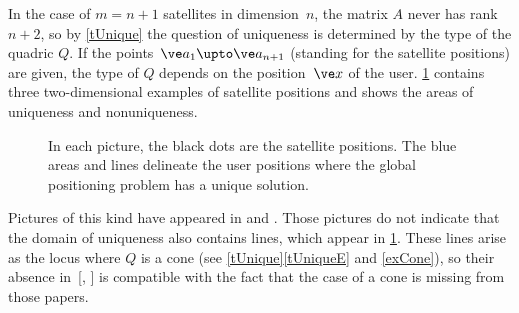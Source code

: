 \documentclass[reqno]{amsart}
\begin{document}
\begin{ex} \label{exUnique}%
  In the case of $m = n+1$ satellites in dimension~$n$, the matrix $A$ never has rank~$n + 2$, so by
  \cref{tUnique} the question of uniqueness is determined by the type
  of the quadric $Q$. If the points~$\ve a_1 \upto \ve a_{n+1}$
  (standing for the satellite positions) are
  given, the type of $Q$ depends on the position~$\ve x$ of the
  user. \cref{fUnique} contains three two-dimensional examples of
  satellite positions and shows the areas of uniqueness and
  nonuniqueness.
  
  \begin{figure}[htbp]
    \centering%
     \hspace{5mm} 
    \hspace{5mm} 
    \caption{In each picture, the black dots are the satellite
      positions. The blue areas and lines delineate the user positions
      where the global positioning problem has a unique solution.}
    \label{fUnique}
  \end{figure}
  
  Pictures of this kind have appeared in  and
  . Those pictures do not indicate that the
  domain of uniqueness also contains lines, which appear in
  \cref{fUnique}. These lines arise as the locus where $Q$ is a cone
  (see \cref{tUnique}\ref{tUniqueE} and \cref{exCone}), so their
  absence in~[,
  ] is compatible with the fact that the
  case of a cone is missing from those papers.
\end{ex}
\end{document}

